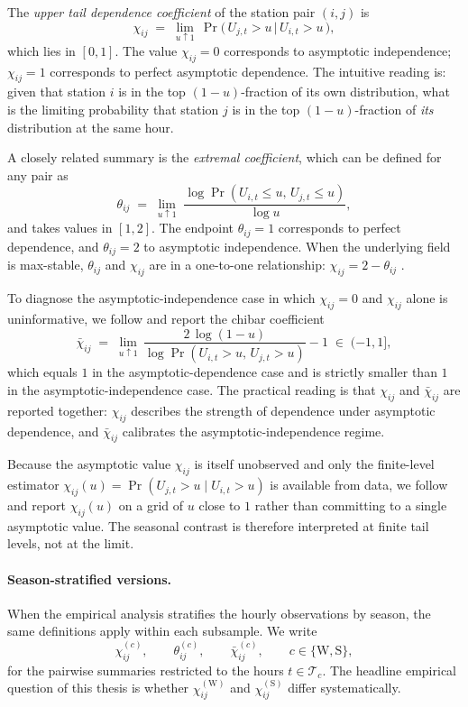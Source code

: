The \emph{upper tail dependence coefficient} of the station pair
\((i,j)\) is
\[
    \chi_{ij}
    \;=\;
    \lim_{u \uparrow 1}\,
    \Pr\!\bigl(\, U_{j,t} > u \,\big|\, U_{i,t} > u \,\bigr),
\]
which lies in \([0,1]\). The value \(\chi_{ij}=0\) corresponds to
asymptotic independence; \(\chi_{ij}=1\) corresponds to perfect
asymptotic dependence. The intuitive reading is: given that
station \(i\) is in the top \((1-u)\)-fraction of its own
distribution, what is the limiting probability that station \(j\)
is in the top \((1-u)\)-fraction of \emph{its} distribution at the
same hour.

A closely related summary is the \emph{extremal coefficient}, which
can be defined for any pair as
\[
    \theta_{ij}
    \;=\;
    \lim_{u\uparrow 1}\;
    \frac{\log \Pr(U_{i,t}\le u,\,U_{j,t}\le u)}{\log u},
\]
and takes values in \([1,2]\). The endpoint \(\theta_{ij}=1\)
corresponds to perfect dependence, and \(\theta_{ij}=2\) to
asymptotic independence. When the underlying field is max-stable,
\(\theta_{ij}\) and \(\chi_{ij}\) are in a one-to-one relationship:
\(\chi_{ij} = 2 - \theta_{ij}\)
\citep{TODO-davison2012,TODO-cooley2012}.

To diagnose the asymptotic-independence case in which
\(\chi_{ij}=0\) and \(\chi_{ij}\) alone is uninformative, we follow
\citet{TODO-cooley2012} and report the chibar coefficient
\[
    \bar\chi_{ij}
    \;=\; \lim_{u \uparrow 1}\,
    \frac{2\,\log(1-u)}{\log \Pr(U_{i,t} > u,\, U_{j,t} > u)} - 1
    \;\in\; (-1, 1],
\]
which equals \(1\) in the asymptotic-dependence case and is
strictly smaller than \(1\) in the asymptotic-independence case.
The practical reading is that \(\chi_{ij}\) and \(\bar\chi_{ij}\)
are reported together: \(\chi_{ij}\) describes the strength of
dependence under asymptotic dependence, and \(\bar\chi_{ij}\)
calibrates the asymptotic-independence regime.

Because the asymptotic value \(\chi_{ij}\) is itself unobserved
and only the finite-level estimator
\(\chi_{ij}(u) = \Pr(U_{j,t} > u \mid U_{i,t} > u)\) is available
from data, we follow \citet{TODO-wadsworth2012} and report
\(\chi_{ij}(u)\) on a grid of \(u\) close to \(1\) rather than
committing to a single asymptotic value. The seasonal contrast is
therefore interpreted at finite tail levels, not at the limit.

\paragraph{Season-stratified versions.}
When the empirical analysis stratifies the hourly observations by
season, the same definitions apply within each subsample. We write
\[
    \chi_{ij}^{(c)},\qquad \theta_{ij}^{(c)},\qquad \bar\chi_{ij}^{(c)},
    \qquad c \in \{\mathrm{W},\mathrm{S}\},
\]
for the pairwise summaries restricted to the hours
\(t \in \mathcal{T}_c\). The headline empirical question of this
thesis is whether \(\chi_{ij}^{(\mathrm{W})}\) and
\(\chi_{ij}^{(\mathrm{S})}\) differ systematically.

